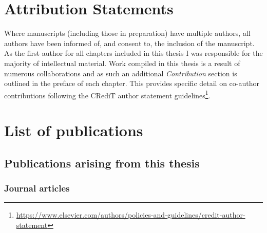 \documentclass[a4paper, nobind]{templates/ociamthesis}
\begin{document}
\hypertarget{attribution-statements}{%
\section*{Attribution Statements}\label{attribution-statements}}

Where manuscripts (including those in preparation) have multiple authors, all authors have been informed of, and consent to, the inclusion of the manuscript.
As the first author for all chapters included in this thesis I was responsible for the majority of intellectual material.
Work compiled in this thesis is a result of numerous collaborations and as such an additional \emph{Contribution} section is outlined in the preface of each chapter. This provides specific detail on co-author contributions following the CRediT author statement guidelines\footnote{\url{https://www.elsevier.com/authors/policies-and-guidelines/credit-author-statement}}.

\hypertarget{list-of-publications}{%
\section*{List of publications}\label{list-of-publications}}

\hypertarget{publications-arising-from-this-thesis}{%
\subsection*{Publications arising from this thesis}\label{publications-arising-from-this-thesis}}

\hypertarget{journal-articles}{%
\subsubsection*{Journal articles}\label{journal-articles}}
\end{document}
